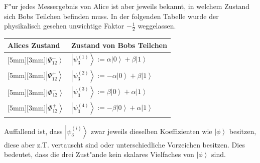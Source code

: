 \begin{refsection}
F"ur jedes Messergebnis von Alice ist aber jeweils bekannt, in welchem Zustand sich Bobs Teilchen befinden muss. In der folgenden Tabelle wurde der physikalisch gesehen unwichtige Faktor $-\frac{1}{2}$ weggelassen.
\begin{center}
   \begin{tabular}{| l | l |}
   \hline
   Alices Zustand & Zustand von Bobs Teilchen \strut \\
    \hline
     \raisebox{0mm}[5mm][3mm]{}$\left| \Psi_{12}^{-} \right\rangle$ & $ \left| \psi_{3}^{(1)} \right\rangle := \alpha \left| 0 \right \rangle + \beta \left| 1 \right \rangle $ \\ \hline
     \raisebox{0mm}[5mm][3mm]{}$\left| \Psi_{12}^{+} \right\rangle$ & $ \left| \psi_{3}^{(2)} \right\rangle := -\alpha \left| 0 \right \rangle + \beta \left| 1 \right \rangle $ \\ \hline
     \raisebox{0mm}[5mm][3mm]{}$\left| \Phi_{12}^{-} \right\rangle$ & $ \left| \psi_{3}^{(3)} \right\rangle := \beta \left| 0 \right \rangle + \alpha \left| 1 \right \rangle $ \\ \hline
     \raisebox{0mm}[5mm][3mm]{}$\left| \Phi_{12}^{+} \right\rangle$ & $ \left| \psi_{3}^{(4)} \right\rangle := -\beta \left| 0 \right \rangle + \alpha \left| 1 \right \rangle $ \\ \hline
   \end{tabular}
\end{center}

Auffallend ist, dass $\left| \psi_{3}^{(i)} \right\rangle$ zwar jeweils dieselben Koeffizienten wie $\left| \phi \right\rangle$ besitzen, diese aber z.T. vertauscht sind oder unterschiedliche Vorzeichen besitzen. Dies bedeutet, dass die drei Zust"ande kein skalares Vielfaches von $\left| \phi \right\rangle$ sind.


\end{refsection}

